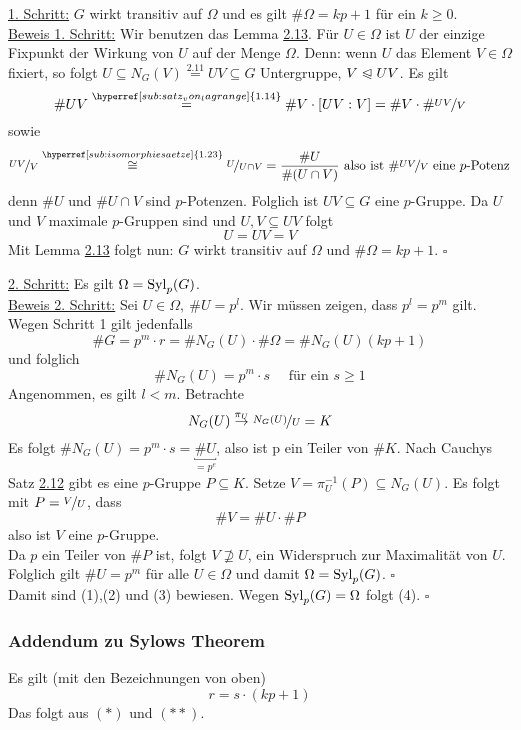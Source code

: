 \uline{1. Schritt:} $G$ wirkt transitiv auf $\Omega$ und es gilt $\#\Omega=kp+1$ für ein $k\ge0$.\\
\uline{Beweis 1. Schritt:} Wir benutzen das Lemma \hyperref[sub:lemma_3]{2.13}. 
Für $U\in \Omega$ ist $U$ der einzige Fixpunkt der Wirkung von $U$ auf der Menge $\Omega$. 
Denn: 
wenn $U$ das Element $V\in \Omega$ fixiert, so folgt $U\subseteq N_G(V)\stackrel{\hyperref[sub:def_normalisator]{2.11}}{=} UV\subseteq G$ Untergruppe, $V\trianglelefteqslant UV$. 
Es gilt 
\[
\#UV\stackrel{\hyperref[sub:satz_von_lagrange]{1.14}}{=}\#V\cdot[UV:V]=\#V\cdot\#\nicefrac{UV}{V}
\]
sowie 
\[ 
\nicefrac{UV}{V} \stackrel{\hyperref[sub:isomorphiesaetze]{1.23}}{\cong} \nicefrac{U}{U\cap V}= \frac{\#U}{\#(U\cap V)}\text{ also ist }\#\nicefrac{UV}{V} \text{ eine $p$-Potenz} 
\]
denn $\#U$ und $\#U\cap V$ sind $p$-Potenzen. 
Folglich ist $UV\subseteq G$ eine $p$-Gruppe. 
Da $U$ und $V$ maximale $p$-Gruppen sind und $U,V\subseteq UV$ folgt 
\[
U=UV=V 
\]
Mit Lemma \hyperref[sub:lemma_3]{2.13} folgt nun: 
$G$ wirkt transitiv auf $\Omega$ und $\#\Omega=kp+1$.
\hfill $\square$

\uline{2. Schritt:} Es gilt $\Omega=\operatorname{Syl}_p(G)$.\\
\uline{Beweis 2. Schritt:} Sei $U\in \Omega,~\#U=p^l$. 
Wir müssen zeigen, dass $p^l=p^m$ gilt.\\
Wegen Schritt 1 gilt jedenfalls 
\[
\#G=p^m\cdot r= \#N_G(U)\cdot \#\Omega= \#N_G(U)(kp+1) \tag*{$(\ast)$} 
\]
und folglich 
\[
\#N_G(U)=p^m\cdot s \quad \text{ für ein } s\ge 1 \tag*{$(\ast\ast)$} 
\]
Angenommen, es gilt $l<m$. 
Betrachte 
\[
N_G(U)\stackrel{\pi_U}{\to}\nicefrac{N_G(U)}{U}=K 
\]
Es folgt $\#N_G(U)=p^m\cdot s=\underbracket{\#U}_{=p^e}$, also ist p ein Teiler von $\#K$. 
Nach Cauchys Satz \hyperref[sub:cauchys_satz]{2.12} gibt es eine $p$-Gruppe $P\subseteq K$. 
Setze $V=\pi_U^{-1}(P)\subseteq N_G(U)$. 
Es folgt mit $P=\nicefrac{V}{U}$, dass 
\[
\#V=\#U\cdot \#P 
\]
also ist $V$ eine $p$-Gruppe.\\
Da $p$ ein Teiler von $\#P$ ist, folgt $V\nsupseteq U$, ein Widerspruch zur Maximalität von $U$.\\
Folglich gilt $\#U=p^m$ für alle $U\in \Omega$ und damit $\Omega=\operatorname{Syl}_p(G)$.
\hfill $\square$
\\
Damit sind (1),(2) und (3) bewiesen. 
Wegen $\operatorname{Syl}_p(G)=\Omega$ folgt (4).
\hfill $\square$

\subsubsection*{Addendum zu Sylows Theorem}
Es gilt (mit den Bezeichnungen von oben) 
\[
r=s\cdot(kp+1) 
\]
Das folgt aus $(\ast)$ und $(\ast\ast)$.

